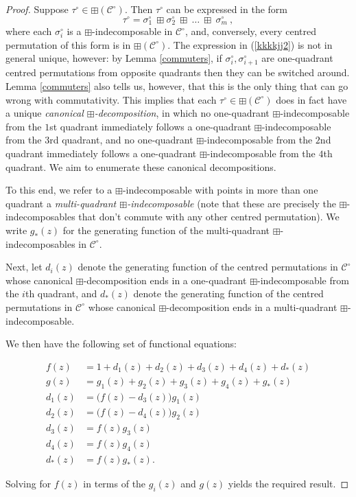 \documentclass[11pt,a4paper]{article}
\theoremstyle{definition}
\begin{document}
\begin{proof}
Suppose $\tau^{\circ} \in \boxplus\left(\mathcal{C}^{\circ}\right)$. Then $\tau^{\circ}$ can be expressed in the form
\begin{equation} \label{kkkkjj2}
\tau^{\circ} = \sigma^{\circ}_{1} \ \boxplus \sigma^{\circ}_{2} \ \boxplus \ \dots \ \boxplus \ \sigma^{\circ}_{m} \ ,
\end{equation}
where each $\sigma^{\circ}_{i}$ is a $\boxplus$-indecomposable in $\mathcal{C}^{\circ}$, and, conversely, every centred permutation of this form is in $\boxplus\left(\mathcal{C}^{\circ}\right)$. The expression in (\ref{kkkkjj2}) is not in general unique, however: by Lemma \ref{commuters}, if $\sigma^{\circ}_{i}, \sigma^{\circ}_{i+1}$ are one-quadrant centred permutations from opposite quadrants then they can be switched around. Lemma \ref{commuters} also tells us, however, that this is the only thing that can go wrong with commutativity. This implies that each $\tau^{\circ} \in \boxplus\left(\mathcal{C}^{\circ}\right)$ does in fact have a unique \emph{canonical $\boxplus$-decomposition}, in which no one-quadrant $\boxplus$-indecomposable from the $1$st quadrant immediately follows a one-quadrant $\boxplus$-indecomposable from the $3$rd quadrant, and no one-quadrant $\boxplus$-indecomposable from the $2$nd quadrant immediately follows a one-quadrant $\boxplus$-indecomposable from the $4$th quadrant. We aim to enumerate these canonical decompositions.

To this end, we refer to a $\boxplus$-indecomposable with points in more than one quadrant a \emph{multi-quadrant $\boxplus$-indecomposable} (note that these are precisely the $\boxplus$-indecomposables that don't commute with any other centred permutation). We write $g_{*}(z)$ for the generating function of the multi-quadrant $\boxplus$-indecomposables in $\mathcal{C}^{\circ}$.

Next, let $d_{i}(z)$ denote the generating function of the centred permutations in $\mathcal{C}^{\circ}$ whose canonical $\boxplus$-decomposition ends in a one-quadrant $\boxplus$-indecomposable from the $i$th quadrant, and $d_{*}(z)$ denote the generating function of the centred permutations in $\mathcal{C}^{\circ}$ whose canonical $\boxplus$-decomposition ends in a multi-quadrant $\boxplus$-indecomposable.

We then have the following set of functional equations:

\begin{align*}
f(z) & = 1 + d_1(z) + d_2(z) + d_3(z) + d_4(z) + d_*(z) \\
g(z) & = g_{1}(z) + g_{2}(z) + g_{3}(z) + g_{4}(z) + g_{*}(z) \\
d_1(z) & = \big(f(z) - d_3(z)\big) g_1(z) \\
d_2(z) & = \big(f(z) - d_4(z)\big) g_2(z) \\
d_3(z) & = f(z) g_3(z) \\
d_4(z) & = f(z) g_4(z) \\
d_*(z) & = f(z) g_*(z) .
\end{align*}

Solving for $f(z)$ in terms of the $g_{i}(z)$ and $g(z)$ yields the required result. \qedhere
\end{proof}
\end{document}
